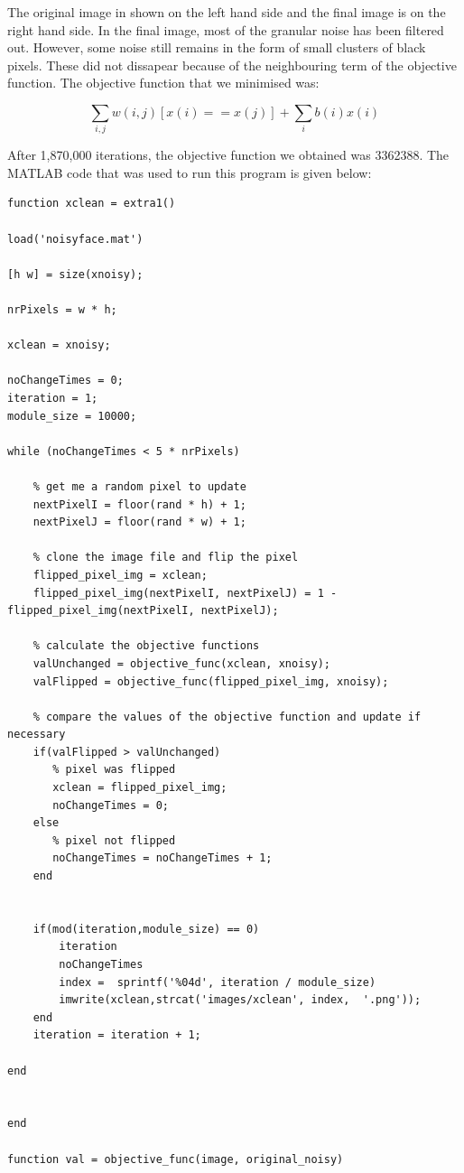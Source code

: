 \documentclass[11pt,a4paper,oneside]{report}
\begin{document}
The original image in shown on the left hand side and the final image is on the 
right hand side. In the final image, most of the granular noise has been 
filtered out. However, some noise still remains in  
the form of small clusters of black pixels. These did not dissapear because of 
the neighbouring term of the objective function. The objective function that we 
minimised was:

$$ \sum_{i,j}w(i,j)[x(i)==x(j)] + \sum_i b(i)x(i)$$

After 1,870,000 iterations, the objective function we obtained was 3362388. 
The MATLAB code that was used to run this program is given below:

\begin{lstlisting}
function xclean = extra1()

load('noisyface.mat')

[h w] = size(xnoisy);

nrPixels = w * h;

xclean = xnoisy;

noChangeTimes = 0;
iteration = 1;
module_size = 10000;
    
while (noChangeTimes < 5 * nrPixels)

    % get me a random pixel to update
    nextPixelI = floor(rand * h) + 1;
    nextPixelJ = floor(rand * w) + 1;

    % clone the image file and flip the pixel
    flipped_pixel_img = xclean;
    flipped_pixel_img(nextPixelI, nextPixelJ) = 1 - 
flipped_pixel_img(nextPixelI, nextPixelJ);

    % calculate the objective functions
    valUnchanged = objective_func(xclean, xnoisy);
    valFlipped = objective_func(flipped_pixel_img, xnoisy);

    % compare the values of the objective function and update if necessary
    if(valFlipped > valUnchanged)
       % pixel was flipped 
       xclean = flipped_pixel_img;
       noChangeTimes = 0;
    else
       % pixel not flipped
       noChangeTimes = noChangeTimes + 1;
    end


    if(mod(iteration,module_size) == 0)
        iteration
        noChangeTimes
        index =  sprintf('%04d', iteration / module_size)
        imwrite(xclean,strcat('images/xclean', index,  '.png'));
    end
    iteration = iteration + 1;
    
end


end

function val = objective_func(image, original_noisy)


\end{lstlisting}
\end{document}
